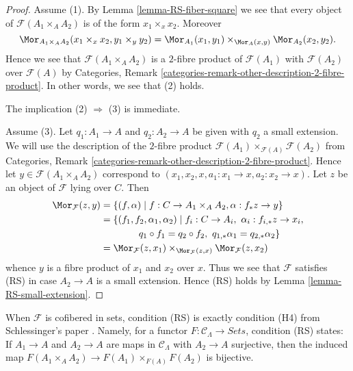 \begin{proof}
Assume (1). By
Lemma \ref{lemma-RS-fiber-square}
we see that every object of $\mathcal{F}(A_1 \times_A A_2)$
is of the form $x_1 \times_x x_2$. Moreover
$$
\Mor_{A_1 \times_A A_2}(x_1 \times_x x_2, y_1 \times_y y_2) =
\Mor_{A_1}(x_1, y_1) \times_{\Mor_A(x, y)}
\Mor_{A_2}(x_2, y_2).
$$
Hence we see that $\mathcal{F}(A_1 \times_A A_2)$ is a $2$-fibre product
of $\mathcal{F}(A_1)$ with $\mathcal{F}(A_2)$ over $\mathcal{F}(A)$ by
Categories, Remark \ref{categories-remark-other-description-2-fibre-product}.
In other words, we see that (2) holds.

\medskip\noindent
The implication (2) $\Rightarrow$ (3) is immediate.

\medskip\noindent
Assume (3). Let $q_1 : A_1 \to A$ and $q_2 : A_2 \to A$ be given with
$q_2$ a small extension. We will use the description of the $2$-fibre product
$\mathcal{F}(A_1) \times_{\mathcal{F}(A)} \mathcal{F}(A_2)$ from
Categories, Remark \ref{categories-remark-other-description-2-fibre-product}.
Hence let $y \in \mathcal{F}(A_1 \times_A A_2)$ correspond to
$(x_1, x_2, x, a_1 : x_1 \to x, a_2 : x_2 \to x)$.
Let $z$ be an object of $\mathcal{F}$ lying over $C$. Then
\begin{align*}
\Mor_\mathcal{F}(z, y) & =
\{(f, \alpha) \mid f : C \to A_1 \times_A A_2,
\alpha : f_*z \to y\} \\
& = \{(f_1, f_2, \alpha_1, \alpha_2) \mid
f_i : C \to A_i, \ \alpha_i : f_{i, *}z \to x_i, \\
& \quad\quad\quad\quad
q_1 \circ f_1 = q_2 \circ f_2, \ q_{1, *} \alpha_1 = q_{2, *}\alpha_2\} \\
& =
\Mor_\mathcal{F}(z, x_1) \times_{\Mor_\mathcal{F}(z, x)}
\Mor_\mathcal{F}(z, x_2)
\end{align*}
whence $y$ is a fibre product of $x_1$ and $x_2$ over $x$. Thus we see
that $\mathcal{F}$ satisfies (RS) in case $A_2 \to A$ is a small extension.
Hence (RS) holds by
Lemma \ref{lemma-RS-small-extension}.
\end{proof}

\begin{remark}
\label{remark-compare-schlessinger-H4}
When $\mathcal{F}$ is cofibered in sets, condition (RS) is exactly condition
(H4) from Schlessinger's paper \cite[Theorem 2.11]{Sch}.  Namely, for
a functor $F: \mathcal{C}_\Lambda \to \textit{Sets}$, condition
(RS) states: If $A_1 \to A$ and $A_2 \to A$ are maps in
$\mathcal{C}_\Lambda$ with $A_2 \to A$ surjective, then the induced
map $F(A_1 \times_A A_2) \to F(A_1) \times_{F(A)} F(A_2)$ is
bijective.
\end{remark}

